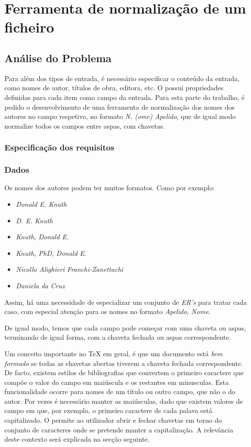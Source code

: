 \chapter{Ferramenta de normalização de um ficheiro }
\label{chap:b1}



\section{Análise do Problema}
\label{sec:b1p:b1}
Para além dos tipos de entrada, é necessário especificar o conteúdo da entrada,
como nomes de autor, títulos de obra, editora, etc. O  possui
propriedades definidas para cada item como campo da entrada.  
Para esta parte do trabalho, é pedido o desenvolvimento de uma ferramenta de
normalização dos nomes dos autores no campo respetivo, no formato \emph{N. (ome)
Apelido}, que de igual modo normalize todos os campos entre aspas, com
chavetas. 

\subsection{Especificação dos requisitos}
\label{sec:spec:b1}

\subsection{Dados}
Os nomes dos autores podem ter muitos formatos. Como por exemplo:

\begin{itemize}
  \item \emph{Donald E. Knuth}
  \item \emph{D. E. Knuth}
  \item \emph{Knuth, Donald E.}
  \item \emph{Knuth, PhD, Donald E.}
  \item \emph{Nicollo Alighieri Franchi-Zanettachi}
  \item \emph{Daniela da Cruz}
\end{itemize}

Assim, há uma necessidade de especializar um conjunto de \emph{ER's} para tratar
cada caso, com especial atenção para os nomes no formato \emph{Apelido, Nome}.

De igual modo, temos que cada campo pode começar com uma chaveta ou aspas,
terminando de igual forma, com a chaveta fechada ou aspas correspondente.

Um conceito importante no \TeX{} em geral, é que um documento está \emph{bem
formado} se todas as chavetas abertas tiverem a chaveta fechada correspondente.
De facto, existem estilos de bibliografias que convertem o primeiro caractere
que compõe o valor do campo em maiúscula e os restantes em minusculas. Esta
funcionalidade ocorre para nomes de um título ou outro campo, que não o do
autor. Por vezes é necessário manter as maiúsculas, dado que existem valores de
campo em que, por exemplo, o primeiro caractere de cada palava está
capitalizado. O  permite ao utilizador abrir e fechar chavetas em
torno do conjunto de caracteres onde se pretende manter a capitalização.
A relevância deste contexto será explicada na secção seguinte.


